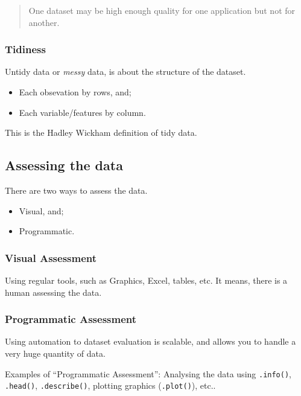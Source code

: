 \documentclass[]{book}
\providecommand{\tightlist}{%
  \setlength{\itemsep}{0pt}\setlength{\parskip}{0pt}}
\begin{document}
\begin{quote}
One dataset may be high enough quality for one application but not for
another.
\end{quote}

\subsubsection{Tidiness}\label{tidiness}

Untidy data or \emph{messy} data, is about the structure of the dataset.

\begin{itemize}
\tightlist
\item
  Each obsevation by rows, and;
\item
  Each variable/features by column.
\end{itemize}

This is the Hadley Wickham definition of tidy data.

\subsection{Assessing the data}\label{assessing-the-data}

There are two ways to assess the data.

\begin{itemize}
\tightlist
\item
  Visual, and;
\item
  Programmatic.
\end{itemize}

\subsubsection{Visual Assessment}\label{visual-assessment}

Using regular tools, such as Graphics, Excel, tables, etc. It means,
there is a human assessing the data.

\subsubsection{Programmatic Assessment}\label{programmatic-assessment}

Using automation to dataset evaluation is scalable, and allows you to
handle a very huge quantity of data.

Examples of ``Programmatic Assessment'': Analysing the data using
\texttt{.info()}, \texttt{.head()}, \texttt{.describe()}, plotting
graphics (\texttt{.plot()}), etc..
\end{document}
